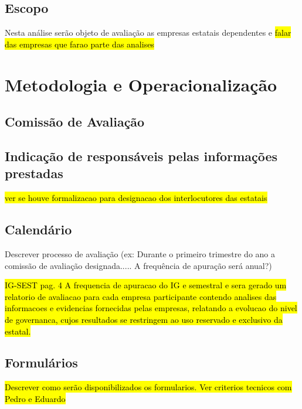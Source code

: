 
	
\section{Escopo}
	
Nesta análise serão objeto de avaliação as empresas estatais dependentes e 
\hl{falar das empresas que farao parte das analises}
	
\chapter{Metodologia e Operacionalização}
\label{chp:metodologia}
	
\section{Comissão de Avaliação}
\label{sec:comissao}

\section{Indicação de responsáveis pelas informações prestadas}
    
\hl{ver se houve formalizacao para designacao dos interlocutores das estatais}
	
\section{Calendário}
\label{sec:calendario}

Descrever processo de avaliação (ex: Durante o primeiro trimestre do ano a comissão de avaliação designada..... A frequência de apuração será anual?)

\hl{IG-SEST pag. 4 A frequencia de apuracao do IG e semestral e sera gerado um relatorio de avaliacao para cada empresa participante contendo analises das informacoes e evidencias fornecidas pelas empresas, relatando a evolucao do nivel de governanca, cujos resultados se restringem ao uso reservado e exclusivo da estatal.}
	
\section{Formulários}
\hl{Descrever como serão disponibilizados os formularios. Ver criterios tecnicos com Pedro e Eduardo}


